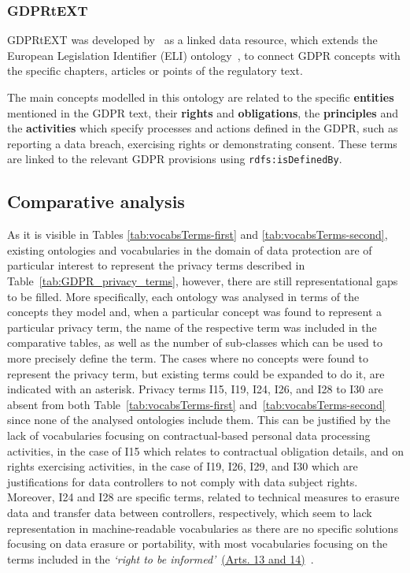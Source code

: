 \subsubsection{GDPRtEXT}
\label{sec:gdprtext}

GDPRtEXT was developed by~\cite{gangemi_gdprtext_2018} as a linked data resource, which extends the European Legislation Identifier (ELI) ontology~\citep{office_of_publications_on_eur-lex_eu_2017}, to connect GDPR concepts with the specific chapters, articles or points of the regulatory text.

The main concepts modelled in this ontology are related to the specific \textbf{entities} mentioned in the GDPR text, their \textbf{rights} and \textbf{obligations}, the \textbf{principles} and the \textbf{activities} which specify processes and actions defined in the GDPR, such as reporting a data breach, exercising rights or demonstrating consent.
These terms are linked to the relevant GDPR provisions using \texttt{rdfs:isDefinedBy}.

\subsection{Comparative analysis}
\label{sec:sota_vocabularies_analysis}

As it is visible in Tables \ref{tab:vocabsTerms-first} and \ref{tab:vocabsTerms-second}, existing ontologies and vocabularies in the domain of data protection are of particular interest to represent the privacy terms described in Table~\ref{tab:GDPR_privacy_terms}, however, there are still representational gaps to be filled.
More specifically, each ontology was analysed in terms of the concepts they model and, when a particular concept was found to represent a particular privacy term, the name of the respective term was included in the comparative tables, as well as the number of sub-classes which can be used to more precisely define the term.
The cases where no concepts were found to represent the privacy term, but existing terms could be expanded to do it, are indicated with an asterisk.
Privacy terms I15, I19, I24, I26, and I28 to I30 are absent from both Table~\ref{tab:vocabsTerms-first} and~\ref{tab:vocabsTerms-second} since none of the analysed ontologies include them.
This can be justified by the lack of vocabularies focusing on contractual-based personal data processing activities, in the case of I15 which relates to contractual obligation details, and on rights exercising activities, in the case of I19, I26, I29, and I30 which are justifications for data controllers to not comply with data subject rights.
Moreover, I24 and I28 are specific terms, related to technical measures to erasure data and transfer data between controllers, respectively, which seem to lack representation in machine-readable vocabularies as there are no specific solutions focusing on data erasure or portability, with most vocabularies focusing on the terms included in the \textit{`right to be informed'}~\hyperref[art:13-14]{(Arts. 13 and 14)}~\citeyearpar{noauthor_regulation_2016}.

